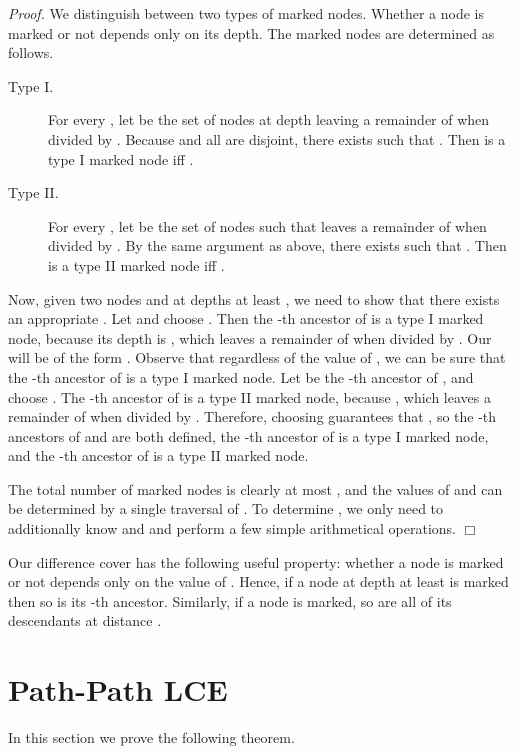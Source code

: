 \documentclass [10pt]{article}
\newcommand{\qed}{\hfill\ensuremath{\Box}\medskip\\\noindent}
\newenvironment{proof}{\noindent\emph{Proof. }}{}
\begin{document}
\begin{proof}
We distinguish between two types of marked nodes. Whether a node  is marked or not depends only on its depth.
The marked nodes are determined as follows.

\begin{description}
\item[Type I.] For every , let  be the set of nodes at depth leaving a remainder of  when divided by . Because
 and all  are disjoint, there exists  such that . Then  is a type I marked node
iff .
\item[Type II.]  For every , let  be the set of nodes  such that  leaves a remainder
of  when divided by . By the same argument as above, there exists  such that . Then  is a type II marked
node iff .
\end{description}

Now, given two nodes  and  at depths at least , we need to show that there exists an appropriate . Let
 and choose . Then the -th ancestor of  is a type I marked node, because
its depth is , which leaves a remainder of  when divided by .
Our  will be of the form . Observe that regardless of the value of , we can be sure that the -th ancestor
of  is a type I marked node. Let  be the -th ancestor of ,  and choose
. The -th ancestor of  is a type II marked node, because
, which leaves a remainder of  when divided by .
Therefore, choosing  guarantees that , so the -th ancestors of  and  are both
defined, the -th ancestor of  is a type I marked node, and the -th ancestor of  is a type II marked node.

The total number of marked nodes is clearly at most , and the values of  and  can be determined by a single traversal of .
To determine , we only need to additionally know  and  and perform a few simple arithmetical operations.
\qed
\end{proof}

 Our difference cover has the following useful property: whether a node  is marked or not depends only on
the value of . Hence, if a node at depth at least  is marked then so is its -th ancestor. Similarly, if
a node is marked, so are all of its descendants at distance .

\section{Path-Path LCE} 
\label{sec:path-path}

In this section we prove the following theorem.
\end{document}
